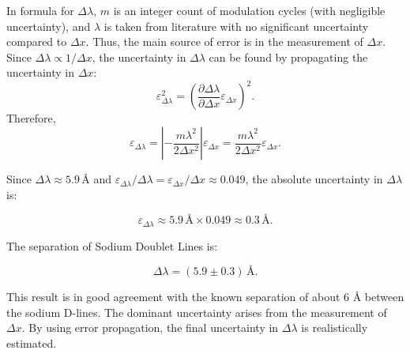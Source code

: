 In formula for \(\Delta \lambda\), \(m\) is an integer count of modulation cycles (with negligible uncertainty), and \(\lambda\) is taken from literature with no significant uncertainty compared to \(\Delta x\). Thus, the main source of error is in the measurement of \(\Delta x\).  Since \(\Delta \lambda \propto 1/\Delta x\), the uncertainty in \(\Delta \lambda\) can be found by propagating the uncertainty in \(\Delta x\):
\[
\varepsilon_{\Delta \lambda}^2 = \left(\frac{\partial \Delta \lambda}{\partial \Delta x}\varepsilon_{\Delta x}\right)^2.
\]
Therefore,
\[
\varepsilon_{\Delta \lambda} = \left|-\frac{m \lambda^2}{2 \Delta x^2}\right|\varepsilon_{\Delta x} = \frac{m \lambda^2}{2 \Delta x^2}\varepsilon_{\Delta x}.
\]







Since \(\Delta \lambda \approx 5.9\, \text{Å}\) and \(\varepsilon_{\Delta \lambda}/\Delta \lambda = \varepsilon_{\Delta x}/\Delta x \approx 0.049\), the absolute uncertainty in \(\Delta \lambda\) is:

\[
\varepsilon_{\Delta \lambda} \approx 5.9\,\text{Å} \times 0.049 \approx 0.3\,\text{Å}.
\]

The separation of Sodium Doublet Lines is: 

\[
\Delta \lambda = (5.9 \pm 0.3)\,\text{Å}.
\]

This result is in good agreement with the known separation of about 6 Å between the sodium D-lines. The dominant uncertainty arises from the measurement of \(\Delta x\). By using error propagation, the final uncertainty in \(\Delta \lambda\) is realistically estimated.


